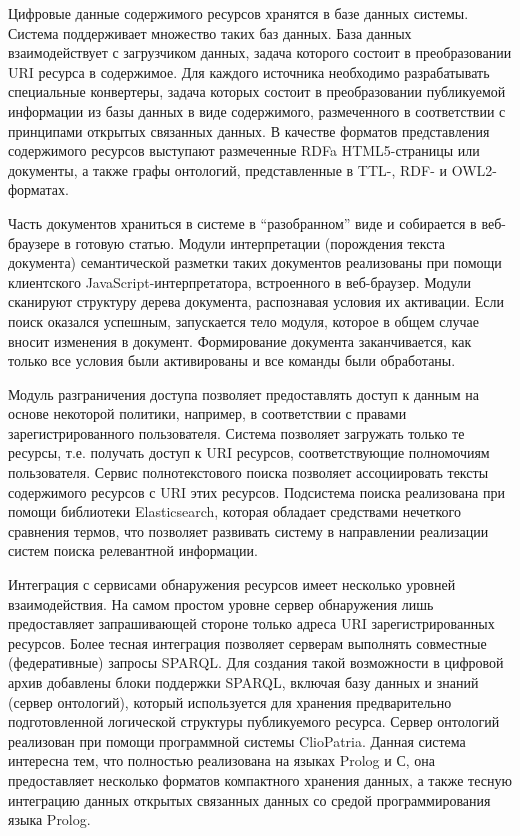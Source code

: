 \documentclass[a4paper,12pt,openany,final]{extreport}
\begin{document}
Цифровые данные содержимого ресурсов хранятся в базе данных системы.
Система поддерживает множество таких баз данных. База данных
взаимодействует с загрузчиком данных, задача которого состоит в
преобразовании URI ресурса в содержимое. Для каждого источника
необходимо разрабатывать специальные конвертеры, задача которых состоит
в преобразовании публикуемой информации из базы данных в виде
содержимого, размеченного в соответствии с принципами открытых связанных
данных. В качестве форматов представления содержимого ресурсов выступают
размеченные RDFa HTML5-страницы или документы, а также графы онтологий,
представленные в TTL-, RDF- и OWL2-форматах.

Часть документов храниться в системе в ``разобранном'' виде и собирается
в веб-браузере в готовую статью. Модули интерпретации (порождения текста
документа) семантической разметки таких документов реализованы при
помощи клиентского JavaScript-интерпретатора, встроенного в веб-браузер.
Модули сканируют структуру дерева документа, распознавая условия их
активации. Если поиск оказался успешным, запускается тело модуля,
которое в общем случае вносит изменения в документ. Формирование
документа заканчивается, как только все условия были активированы и все
команды были обработаны.

Модуль разграничения доступа позволяет предоставлять доступ к данным на
основе некоторой политики, например, в соответствии с правами
зарегистрированного пользователя. Система позволяет загружать только те
ресурсы, т.е. получать доступ к URI ресурсов, соответствующие
полномочиям пользователя. Сервис полнотекстового поиска позволяет
ассоциировать тексты содержимого ресурсов с URI этих ресурсов.
Подсистема поиска реализована при помощи библиотеки Elasticsearch,
которая обладает средствами нечеткого сравнения термов, что позволяет
развивать систему в направлении реализации систем поиска релевантной
информации.

Интеграция с сервисами обнаружения ресурсов имеет несколько уровней
взаимодействия. На самом простом уровне сервер обнаружения лишь
предоставляет запрашивающей стороне только адреса URI зарегистрированных
ресурсов. Более тесная интеграция позволяет серверам выполнять
совместные (федеративные) запросы SPARQL. Для создания такой возможности
в цифровой архив добавлены блоки поддержки SPARQL, включая базу данных и
знаний (сервер онтологий), который используется для хранения
предварительно подготовленной логической структуры публикуемого ресурса.
Сервер онтологий реализован при помощи программной системы ClioPatria.
Данная система интересна тем, что полностью реализована на языках Prolog
и С, она предоставляет несколько форматов компактного хранения данных, а
также тесную интеграцию данных открытых связанных данных со средой
программирования языка Prolog.
\end{document}
